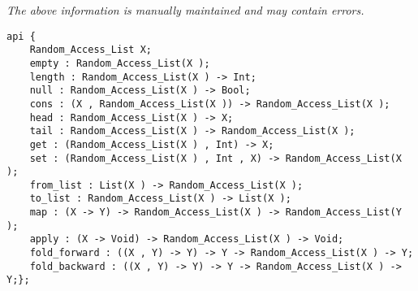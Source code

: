 \label{api:Random\_Access\_List}

{\tiny \it The above information is manually maintained and may contain errors.}
\begin{verbatim}
api {
    Random_Access_List X;
    empty : Random_Access_List(X );
    length : Random_Access_List(X ) -> Int;
    null : Random_Access_List(X ) -> Bool;
    cons : (X , Random_Access_List(X )) -> Random_Access_List(X );
    head : Random_Access_List(X ) -> X;
    tail : Random_Access_List(X ) -> Random_Access_List(X );
    get : (Random_Access_List(X ) , Int) -> X;
    set : (Random_Access_List(X ) , Int , X) -> Random_Access_List(X );
    from_list : List(X ) -> Random_Access_List(X );
    to_list : Random_Access_List(X ) -> List(X );
    map : (X -> Y) -> Random_Access_List(X ) -> Random_Access_List(Y );
    apply : (X -> Void) -> Random_Access_List(X ) -> Void;
    fold_forward : ((X , Y) -> Y) -> Y -> Random_Access_List(X ) -> Y;
    fold_backward : ((X , Y) -> Y) -> Y -> Random_Access_List(X ) -> Y;};
\end{verbatim}
